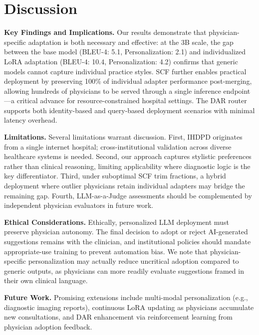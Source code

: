 \section{Discussion}

\textbf{Key Findings and Implications.} Our results demonstrate that physician-specific adaptation is both necessary and effective: at the 3B scale, the gap between the base model (BLEU-4: 5.1, Personalization: 2.1) and individualized LoRA adaptation (BLEU-4: 10.4, Personalization: 4.2) confirms that generic models cannot capture individual practice styles. SCF further enables practical deployment by preserving 100\% of individual adapter performance post-merging, allowing hundreds of physicians to be served through a single inference endpoint---a critical advance for resource-constrained hospital settings. The DAR router supports both identity-based and query-based deployment scenarios with minimal latency overhead.


\textbf{Limitations.} Several limitations warrant discussion. First, IHDPD originates from a single internet hospital; cross-institutional validation across diverse healthcare systems is needed. Second, our approach captures stylistic preferences rather than clinical reasoning, limiting applicability where diagnostic logic is the key differentiator. Third, under suboptimal SCF trim fractions, a hybrid deployment where outlier physicians retain individual adapters may bridge the remaining gap. Fourth, LLM-as-a-Judge assessments should be complemented by independent physician evaluators in future work.


\textbf{Ethical Considerations.} Ethically, personalized LLM deployment must preserve physician autonomy. The final decision to adopt or reject AI-generated suggestions remains with the clinician, and institutional policies should mandate appropriate-use training to prevent automation bias. We note that physician-specific personalization may actually reduce uncritical adoption compared to generic outputs, as physicians can more readily evaluate suggestions framed in their own clinical language. 

\textbf{Future Work.} Promising extensions include multi-modal personalization (e.g., diagnostic imaging reports), continuous LoRA updating as physicians accumulate new consultations, and DAR enhancement via reinforcement learning from physician adoption feedback.
